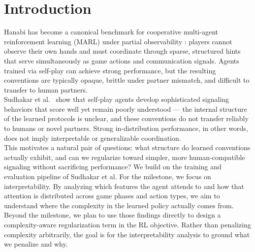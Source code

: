 \documentclass{article}
\begin{document}

\printAffiliationsAndNotice{}

\section{Introduction}

Hanabi has become a canonical benchmark for cooperative multi-agent reinforcement learning (MARL) under partial observability \cite{bard2019hanabi}: players cannot observe their own hands and must coordinate through sparse, structured hints that serve simultaneously as game actions and communication signals. Agents trained via self-play can achieve strong performance, but the resulting conventions are typically opaque, brittle under partner mismatch, and difficult to transfer to human partners. \\

Sudhakar et al.~\cite{sudhakar2025generalist} show that self-play agents develop sophisticated signaling behaviors that score well yet remain poorly understood — the internal structure of the learned protocols is unclear, and these conventions do not transfer reliably to humans or novel partners. Strong in-distribution performance, in other words, does not imply interpretable or generalizable coordination. \\

This motivates a natural pair of questions: what structure do learned conventions actually exhibit, and can we regularize toward simpler, more human-compatible signaling without sacrificing performance? We build on the training and evaluation pipeline of Sudhakar et al. For the milestone, we focus on interpretability. By analyzing which features the agent attends to and how that attention is distributed across game phases and action types, we aim to understand where the complexity in the learned policy  actually comes from. Beyond the milestone, we plan to use those findings directly to design a 
complexity-aware regularization term in the RL objective. Rather than penalizing complexity arbitrarily, the goal is for the interpretability analysis to ground what we penalize and why.
\end{document}
